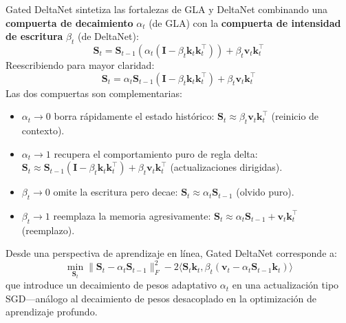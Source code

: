 Gated DeltaNet \citep{yang_gated_deltanet_2024} sintetiza las fortalezas de GLA y DeltaNet combinando una \textbf{compuerta de decaimiento} $\alpha_t$ (de GLA) con la \textbf{compuerta de intensidad de escritura} $\beta_t$ (de DeltaNet):
\[
\mathbf{S}_t = \mathbf{S}_{t-1}\left(\alpha_t (\mathbf{I} - \beta_t \mathbf{k}_t \mathbf{k}_t^\top)\right) + \beta_t \mathbf{v}_t \mathbf{k}_t^\top
\]
Reescribiendo para mayor claridad:
\[
\mathbf{S}_t = \alpha_t \mathbf{S}_{t-1}(\mathbf{I} - \beta_t \mathbf{k}_t \mathbf{k}_t^\top) + \beta_t \mathbf{v}_t \mathbf{k}_t^\top
\]
Las dos compuertas son complementarias:
\begin{itemize}[leftmargin=*]
    \item $\alpha_t \to 0$ borra rápidamente el estado histórico: $\mathbf{S}_t \approx \beta_t \mathbf{v}_t \mathbf{k}_t^\top$ (reinicio de contexto).
    \item $\alpha_t \to 1$ recupera el comportamiento puro de regla delta: $\mathbf{S}_t \approx \mathbf{S}_{t-1}(\mathbf{I} - \beta_t \mathbf{k}_t \mathbf{k}_t^\top) + \beta_t \mathbf{v}_t \mathbf{k}_t^\top$ (actualizaciones dirigidas).
    \item $\beta_t \to 0$ omite la escritura pero decae: $\mathbf{S}_t \approx \alpha_t \mathbf{S}_{t-1}$ (olvido puro).
    \item $\beta_t \to 1$ reemplaza la memoria agresivamente: $\mathbf{S}_t \approx \alpha_t \mathbf{S}_{t-1} + \mathbf{v}_t \mathbf{k}_t^\top$ (reemplazo).
\end{itemize}

Desde una perspectiva de aprendizaje en línea, Gated DeltaNet corresponde a:
\[
\min_{\mathbf{S}_t} \|\mathbf{S}_t - \alpha_t \mathbf{S}_{t-1}\|_F^2 - 2\langle \mathbf{S}_t \mathbf{k}_t, \beta_t(\mathbf{v}_t - \alpha_t \mathbf{S}_{t-1} \mathbf{k}_t)\rangle
\]
que introduce un decaimiento de pesos adaptativo $\alpha_t$ en una actualización tipo SGD---análogo al decaimiento de pesos desacoplado en la optimización de aprendizaje profundo.

